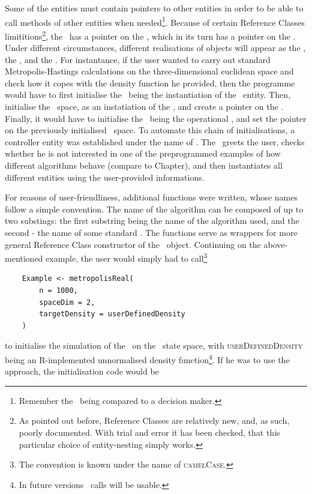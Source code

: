 \documentclass{book}
\begin{document}
Some of the entities must contain pointers to other entities in order to be able to call methods of other entities when needed\footnote{Remember the \algo\, being compared to a decision maker.}. Because of certain Reference Classes limititions\footnote{As pointed out before, Reference Classes are relatively new, and, as such, poorly documented. With trial and error it has been checked, that this particular choice of entity-nesting simply works.}, the \algo\, has a pointer on the \sspace, which in its turn has a pointer on the \measure. Under different circumstances, different realisations of objects will appear as the \algo, the \sspace, and the \measure. For instantance, if the user wanted to carry out standard Metropolis-Hastings calculations on the three-dimensional euclidean space and check how it copes with the density function he provided, then the programme would have to first  initialise the \udensity\, being the instantiation of the \measure\, entity. Then, initialise the \rspace\, space, as an instatiation of the \sspace, and create a pointer on the \udensity. Finally, it would have to initialise the \MH\, being the operational \algo, and set the pointer on the previously initialised \rspace\, space. To automate this chain of initialisations, a controller entity was established under the name of \simulation. The \simulation\, greets the user, checks whether he is not interested in one of the preprogrammed examples of how different algorithms behave (compare to Chapter), and then instantiates all different entities using the user-provided informations. 

For reasons of user-friendliness, additional functions were written, whose names follow a simple convention. The name of the algorithm can be composed of up to two substings: the first substring being the name of the algorithm used, and the second - the name of some standard \sspace. The functions serve as wrappers for more general Reference Class constructor of the \simulation\, object. Continuing on the above-mentioned example, the user would simply had to call\footnote{The convention is known under the name of \textsc{camelCase}.}

\begin{lstlisting}
	Example <- metropolisReal(
		n = 1000,
		spaceDim = 2,
		targetDensity = userDefinedDensity
	)
\end{lstlisting}  
to initialise the simulation of the \MHalgo\, on the \rspace\, state space, with \textsc{userDefinedDensity} being an R-implemented unnormalised density function\footnote{In future versions \Cpp\, calls will be usable.}. If he was to use the \PTalgo\, approach, the initialisation code would be 
\end{document}
